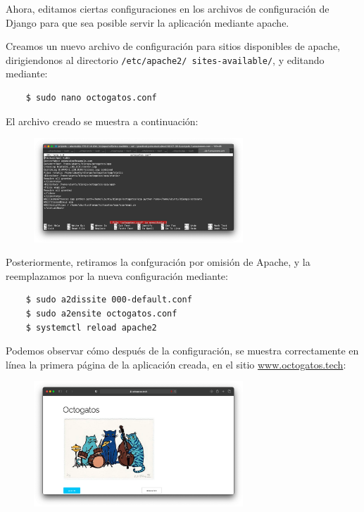 \documentclass{article}
\begin{document}
\begin{enumerate}
    Ahora, editamos ciertas configuraciones en los archivos de configuración
    de Django para que sea posible servir la aplicación mediante apache.


    Creamos un nuevo archivo de configuración para sitios
    disponibles de apache, dirigiendonos al directorio \texttt{/etc/apache2/
    sites-available/}, y editando mediante:
    \begin{lstlisting}
    $ sudo nano octogatos.conf
    \end{lstlisting}

    El archivo creado se muestra a continuación:
    \begin{figure}[H]
      \centering
      \includegraphics[width=0.70\textwidth]{AppServer/i11}
    \end{figure}

    Posteriormente, retiramos la confguración por omisión de Apache, y la
    reemplazamos por la nueva configuración mediante:
    \begin{lstlisting}
    $ sudo a2dissite 000-default.conf
    $ sudo a2ensite octogatos.conf
    $ systemctl reload apache2
    \end{lstlisting}

    Podemos observar cómo después de la configuración, se muestra correctamente
    en línea la primera página de la aplicación creada, en el sitio
    \url{www.octogatos.tech}:

    \begin{figure}[H]
      \centering
      \includegraphics[width=0.70\textwidth]{AppServer/i12}
    \end{figure}


\end{enumerate}
\end{document}
